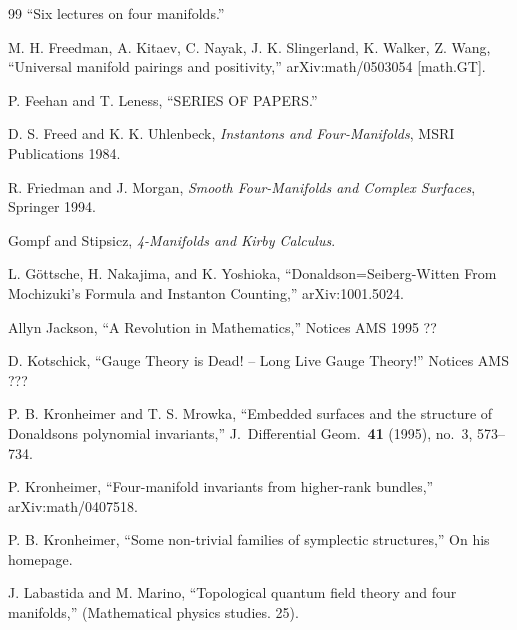\begin{thebibliography}{99}
 ``Six lectures on four manifolds.''

 M. H. Freedman, A. Kitaev, C. Nayak, J. K. Slingerland, K. Walker,
Z. Wang, ``Universal manifold pairings and positivity,'' arXiv:math/0503054 [math.GT].

 P. Feehan and T. Leness, ``SERIES OF PAPERS.''

 D. S. Freed and K. K. Uhlenbeck, \emph{Instantons and Four-Manifolds},
MSRI Publications 1984.

 R. Friedman and J. Morgan, \emph{Smooth Four-Manifolds and Complex
Surfaces}, Springer 1994.

 Gompf and Stipsicz, \emph{4-Manifolds and Kirby Calculus}.

 L. G\"ottsche, H. Nakajima, and K. Yoshioka, ``Donaldson=Seiberg-Witten
From Mochizuki's Formula and Instanton Counting,'' arXiv:1001.5024.

 Allyn Jackson, ``A Revolution in Mathematics,'' Notices AMS 1995 ??

 D. Kotschick, ``Gauge Theory is Dead! -- Long Live Gauge Theory!''
Notices AMS ???

 P. B. Kronheimer and T. S. Mrowka, ``Embedded surfaces and the structure
of Donaldsons polynomial invariants,'' J.\ Differential Geom.\ \textbf{41} (1995), no.~3,
573--734.

 P. Kronheimer, ``Four-manifold invariants from higher-rank bundles,''
arXiv:math/0407518.

 P. B. Kronheimer, ``Some non-trivial families of symplectic structures,''
On his homepage.

 J. Labastida and M. Marino, ``Topological quantum field theory and four
manifolds,'' (Mathematical physics studies. 25).


\end{thebibliography}
